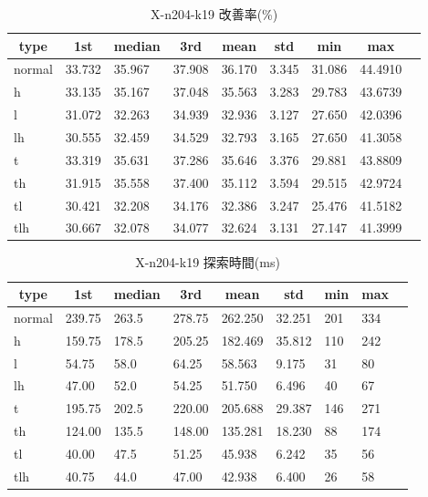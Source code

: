 \begin{table}[htbp]
    \caption{X-n204-k19 改善率(\%)}
    \begin{tabular}{|l|l|l|l|l|l|l|l|l|}\hline
    \multicolumn{1}{|c|}{\textbf{type}}
    &\multicolumn{1}{|c|}{\textbf{1st}}
    &\multicolumn{1}{c|}{\textbf{median}}
    &\multicolumn{1}{c|}{\textbf{3rd}}
    &\multicolumn{1}{c|}{\textbf{mean}}
    &\multicolumn{1}{c|}{\textbf{std}}
    &\multicolumn{1}{c|}{\textbf{min}}
    &\multicolumn{1}{c|}{\textbf{max}}\\\hline
	normal & 33.732 & 35.967 & 37.908 & 36.170 & 3.345 & 31.086 & 44.4910\\\hline
	h & 33.135 & 35.167 & 37.048 & 35.563 & 3.283 & 29.783 & 43.6739\\\hline
	l & 31.072 & 32.263 & 34.939 & 32.936 & 3.127 & 27.650 & 42.0396\\\hline
	lh & 30.555 & 32.459 & 34.529 & 32.793 & 3.165 & 27.650 & 41.3058\\\hline
	t & 33.319 & 35.631 & 37.286 & 35.646 & 3.376 & 29.881 & 43.8809\\\hline
	th & 31.915 & 35.558 & 37.400 & 35.112 & 3.594 & 29.515 & 42.9724\\\hline
	tl & 30.421 & 32.208 & 34.176 & 32.386 & 3.247 & 25.476 & 41.5182\\\hline
	tlh & 30.667 & 32.078 & 34.077 & 32.624 & 3.131 & 27.147 & 41.3999\\\hline
	\end{tabular}
\end{table}
\begin{table}[htbp]
    \caption{X-n204-k19 探索時間(ms)}
    \begin{tabular}{|l|l|l|l|l|l|l|l|l|}\hline
    \multicolumn{1}{|c|}{\textbf{type}}
    &\multicolumn{1}{|c|}{\textbf{1st}}
    &\multicolumn{1}{c|}{\textbf{median}}
    &\multicolumn{1}{c|}{\textbf{3rd}}
    &\multicolumn{1}{c|}{\textbf{mean}}
    &\multicolumn{1}{c|}{\textbf{std}}
    &\multicolumn{1}{c|}{\textbf{min}}
    &\multicolumn{1}{c|}{\textbf{max}}\\\hline
	normal & 239.75 & 263.5 & 278.75 & 262.250 & 32.251 & 201 & 334\\\hline
	h & 159.75 & 178.5 & 205.25 & 182.469 & 35.812 & 110 & 242\\\hline
	l & 54.75 & 58.0 & 64.25 & 58.563 & 9.175 & 31 & 80\\\hline
	lh & 47.00 & 52.0 & 54.25 & 51.750 & 6.496 & 40 & 67\\\hline
	t & 195.75 & 202.5 & 220.00 & 205.688 & 29.387 & 146 & 271\\\hline
	th & 124.00 & 135.5 & 148.00 & 135.281 & 18.230 & 88 & 174\\\hline
	tl & 40.00 & 47.5 & 51.25 & 45.938 & 6.242 & 35 & 56\\\hline
	tlh & 40.75 & 44.0 & 47.00 & 42.938 & 6.400 & 26 & 58\\\hline
	\end{tabular}
\end{table}
